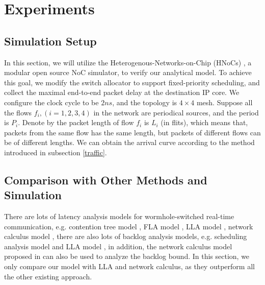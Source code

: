 \documentclass[10pt,journal]{IEEEtran}
\begin{document}
\section{Experiments}\label{experiments}
\subsection{Simulation Setup}
In this section, we will utilize the Heterogenous-Networks-on-Chip (HNoCs) \cite{6404157}, a modular open source NoC simulator, to verify our analytical model. To achieve this goal, we modify the switch allocator to support fixed-priority scheduling, and collect the maximal end-to-end packet delay at the destination IP core. We configure the clock cycle to be $2ns$, and the topology is $4\times 4$ mesh. Suppose all the flows $f_i,(i=1,2,3,4)$ in the network are periodical sources, and the period is $P_i$. Denote by the packet length of flow $f_i$ is $L_i$ (in flits), which means that, packets from the same flow has the same length, but packets of different flows can be of different lengths. We can obtain the arrival curve according to the method introduced in subsection \ref{traffic}.

\subsection{Comparison with Other Methods and Simulation}
There are lots of latency analysis models for wormhole-switched real-time communication, e.g. contention tree model \cite{LuJS05}, FLA model \cite{Shi:2008:RCA:1397757.1397996}, LLA model \cite{73}, network calculus model \cite{Qian489900}, there are also lots of backlog analysis models, e.g. scheduling analysis model \cite{Manolache:2006:BSO:1131481.1131683} and LLA model \cite{189}, in addition, the network calculus model proposed in \cite{Qian489900} can also be used to analyze the backlog bound. In this section, we only compare our model with LLA and network calculus, as they outperform all the other existing approach.
\end{document}
